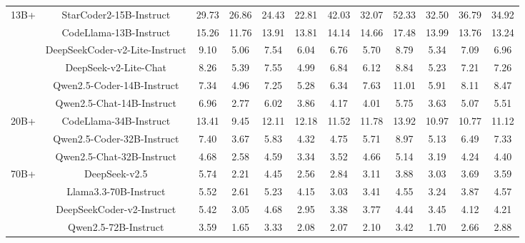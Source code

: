 \documentclass[11pt, a4paper, logo, copyright, nonumbering, amsart]{map}
\begin{document}
\begin{CJK*}{UTF8}{gbsn}
\begin{table*}[h!]
\begin{adjustbox}{width=\textwidth}
\begin{tabular}{c|c|cccccccccc}
    \midrule
    \multirow{6}{*}{13B+} 
    & StarCoder2-15B-Instruct & 29.73 & 26.86 & 24.43 & 22.81 & 42.03 & 32.07 & 52.33 & 32.50 & 36.79 & 34.92 \\
    & CodeLlama-13B-Instruct & 15.26 & 11.76 & 13.91 & 13.81 & 14.14 & 14.66 & 17.48 & 13.99 & 13.76 & 13.24 \\
    & DeepSeekCoder-v2-Lite-Instruct & 9.10 & 5.06 & 7.54 & 6.04 & 6.76 & 5.70 & 8.79 & 5.34 & 7.09 & 6.96 \\
    & DeepSeek-v2-Lite-Chat & 8.26 & 5.39 & 7.55 & 4.99 & 6.84 & 6.12 & 8.84 & 5.23 & 7.21 & 7.26 \\
    & Qwen2.5-Coder-14B-Instruct & 7.34 & 4.96 & 7.25 & 5.28 & 6.34 & 7.63 & 11.01 & 5.91 & 8.11 & 8.47 \\
    & Qwen2.5-Chat-14B-Instruct & 6.96 & 2.77 & 6.02 & 3.86 & 4.17 & 4.01 & 5.75 & 3.63 & 5.07 & 5.51 \\
    
    \midrule
    \multirow{3}{*}{20B+} 
    & CodeLlama-34B-Instruct & 13.41 & 9.45 & 12.11 & 12.18 & 11.52 & 11.78 & 13.92 & 10.97 & 10.77 & 11.12 \\
    & Qwen2.5-Coder-32B-Instruct & 7.40 & 3.67 & 5.83 & 4.32 & 4.75 & 5.71 & 8.97 & 5.13 & 6.49 & 7.33 \\
    & Qwen2.5-Chat-32B-Instruct & 4.68 & 2.58 & 4.59 & 3.34 & 3.52 & 4.66 & 5.14 & 3.19 & 4.24 & 4.40 \\
    
    \midrule
    \multirow{4}{*}{70B+} 
    & DeepSeek-v2.5 & 5.74 & 2.21 & 4.45 & 2.56 & 2.84 & 3.11 & 3.88 & 3.03 & 3.69 & 3.59 \\
    & Llama3.3-70B-Instruct & 5.52 & 2.61 & 5.23 & 4.15 & 3.03 & 3.41 & 4.55 & 3.24 & 3.87 & 4.57 \\
    & DeepSeekCoder-v2-Instruct & 5.42 & 3.05 & 4.68 & 2.95 & 3.38 & 3.77 & 4.44 & 3.45 & 4.12 & 4.21 \\
    & Qwen2.5-72B-Instruct & 3.59 & 1.65 & 3.33 & 2.08 & 2.07 & 2.10 & 3.42 & 1.70 & 2.66 & 2.88 \\
    

\end{tabular}
\end{adjustbox}
\end{table*}
\end{CJK*}
\end{document}
